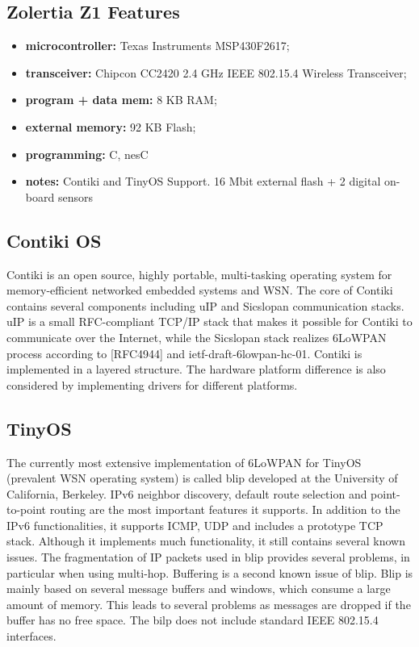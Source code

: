 \documentclass[10pt]{article}
\begin{document}
\subsection{Zolertia Z1 Features}
\begin{itemize}
  \item \textbf{microcontroller:} Texas Instruments MSP430F2617;
  \item \textbf{transceiver:} Chipcon CC2420 2.4 GHz IEEE 802.15.4 Wireless Transceiver;
  \item \textbf{program + data mem:} 8 KB RAM;
  \item \textbf{external memory:} 92 KB Flash;
  \item \textbf{programming:} C, nesC
  \item \textbf{notes:} Contiki and TinyOS Support. 16 Mbit external flash + 2 digital on-board sensors
\end{itemize}


\subsection{Contiki OS}
Contiki is an open source, highly portable, multi-tasking operating system for memory-efficient networked embedded systems and WSN.  The core of Contiki contains several components including uIP and Sicslopan communication stacks. uIP is a small RFC-compliant TCP/IP stack that makes it possible for Contiki to communicate over the Internet, while the Sicslopan stack realizes 6LoWPAN process according to [RFC4944] and ietf-draft-6lowpan-hc-01.  Contiki is implemented in a layered structure.  The hardware platform difference is also considered by implementing drivers for different platforms.  

\subsection{TinyOS}
The currently most extensive implementation of 6LoWPAN for TinyOS (prevalent WSN operating system) is called blip developed at the University of California, Berkeley.  IPv6 neighbor discovery, default route selection and point-to-point routing are the most important features it supports.  In addition to the IPv6 functionalities, it supports ICMP, UDP and includes a prototype TCP stack.  Although it implements much functionality, it still contains several known issues.  The fragmentation of IP packets used in blip provides several problems, in particular when using multi-hop.  Buffering is a second known issue of blip.  Blip is mainly based on several message buffers and windows, which consume a large amount of memory.  This leads to several problems as messages are dropped if the buffer has no free space.  The bilp does not include standard IEEE 802.15.4 interfaces.  
\end{document}
